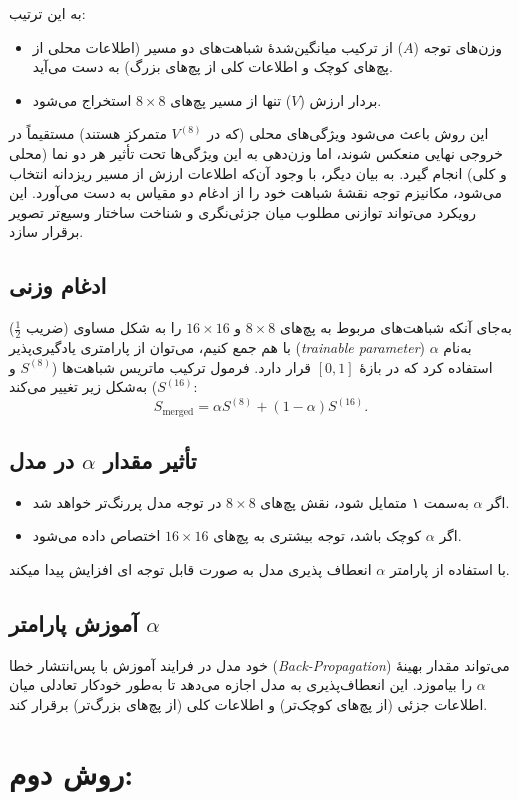 به این ترتیب:
\begin{itemize}
	\item وزن‌های توجه (\(A\)) از ترکیب میانگین‌شدهٔ شباهت‌های دو مسیر (اطلاعات محلی از پچ‌های کوچک و اطلاعات کلی از پچ‌های بزرگ) به دست می‌آید.
	\item بردار ارزش (\(V\)) تنها از مسیر پچ‌های \(8 \times 8\) استخراج می‌شود.
\end{itemize}

این روش باعث می‌شود ویژگی‌های محلی (که در \(V^{(8)}\) متمرکز هستند) مستقیماً در خروجی نهایی منعکس شوند، اما وزن‌دهی به این ویژگی‌ها تحت تأثیر هر دو نما (محلی و کلی) انجام گیرد. به بیان دیگر، با وجود آن‌که اطلاعات ارزش از مسیر ریزدانه انتخاب می‌شود، مکانیزم توجه نقشهٔ شباهت خود را از ادغام دو مقیاس به دست می‌آورد. این رویکرد می‌تواند توازنی مطلوب میان جزئی‌نگری و شناخت ساختار وسیع‌تر تصویر برقرار سازد.

\subsection{ادغام وزنی}



به‌جای آنکه شباهت‌های مربوط به پچ‌های \(8 \times 8\) و \(16 \times 16\) را به شکل مساوی (ضریب \(\frac{1}{2}\)) با هم جمع کنیم، می‌توان از پارامتری یادگیری‌پذیر (\textit{trainable parameter}) به‌نام \(\alpha\) استفاده کرد که در بازهٔ \([0, 1]\) قرار دارد. فرمول ترکیب ماتریس شباهت‌ها (\(S^{(8)}\) و \(S^{(16)}\)) به‌شکل زیر تغییر می‌کند:
\[
S_{\text{merged}} = \alpha S^{(8)} + (1 - \alpha) S^{(16)}.
\]

\subsection*{تأثیر مقدار \(\alpha\) در مدل}
\begin{itemize}
	\item اگر \(\alpha\) به‌سمت ۱ متمایل شود، نقش پچ‌های \(8 \times 8\) در توجه مدل پررنگ‌تر خواهد شد.
	\item اگر \(\alpha\) کوچک باشد، توجه بیشتری به پچ‌های \(16 \times 16\) اختصاص داده می‌شود.
\end{itemize}

با استفاده از پارامتر \(\alpha\) انعطاف پذیری مدل به صورت قابل توجه ای افزایش پیدا میکند.

\subsection*{آموزش پارامتر \(\alpha\)}
خود مدل در فرایند آموزش با پس‌انتشار خطا (\textit{Back-Propagation}) می‌تواند مقدار بهینهٔ \(\alpha\) را بیاموزد. این انعطاف‌پذیری به مدل اجازه می‌دهد تا به‌طور خودکار تعادلی میان اطلاعات جزئی (از پچ‌های کوچک‌تر) و اطلاعات کلی (از پچ‌های بزرگ‌تر) برقرار کند.


\section{روش دوم:}
